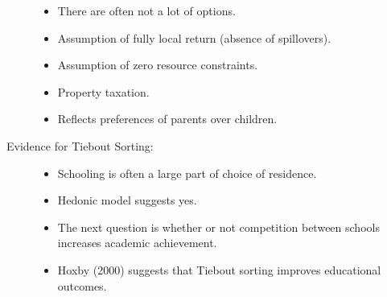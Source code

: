 \documentclass[10pt]{extarticle}
\begin{document}
\begin{description}
\begin{itemize}
        \item There are often not a lot of options.
        \item Assumption of fully local return (absence of spillovers).
        \item Assumption of zero resource constraints.
        \item Property taxation.
        \item Reflects preferences of parents over children.
      \end{itemize}
    \item[Evidence for Tiebout Sorting:]\hfill
      \begin{itemize}
        \item Schooling is often a large part of choice of residence.
        \item Hedonic model suggests yes.
        \item The next question is whether or not competition between schools increases academic achievement.
        \item Hoxby (2000) suggests that Tiebout sorting improves educational outcomes.
      \end{itemize}
  \end{description}
\end{document}
